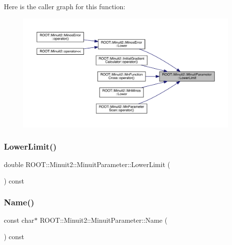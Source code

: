 Here is the caller graph for this function\+:\nopagebreak
\begin{figure}[H]
\begin{center}
\leavevmode
\includegraphics[width=350pt]{dd/dfb/classROOT_1_1Minuit2_1_1MinuitParameter_a25c7f30fc42264f1df96a3852d2e11a4_icgraph}
\end{center}
\end{figure}
\mbox{\label{classROOT_1_1Minuit2_1_1MinuitParameter_a25c7f30fc42264f1df96a3852d2e11a4}} 
\subsubsection{\texorpdfstring{LowerLimit()}{LowerLimit()}\hspace{0.1cm}{\footnotesize\ttfamily [2/2]}}
{\footnotesize\ttfamily double R\+O\+O\+T\+::\+Minuit2\+::\+Minuit\+Parameter\+::\+Lower\+Limit (\begin{DoxyParamCaption}{ }\end{DoxyParamCaption}) const\hspace{0.3cm}{\ttfamily [inline]}}

\mbox{\label{classROOT_1_1Minuit2_1_1MinuitParameter_a151958b5dbcc194a090753e0b2605fbc}} 
\subsubsection{\texorpdfstring{Name()}{Name()}\hspace{0.1cm}{\footnotesize\ttfamily [1/2]}}
{\footnotesize\ttfamily const char$\ast$ R\+O\+O\+T\+::\+Minuit2\+::\+Minuit\+Parameter\+::\+Name (\begin{DoxyParamCaption}{ }\end{DoxyParamCaption}) const\hspace{0.3cm}{\ttfamily [inline]}}

